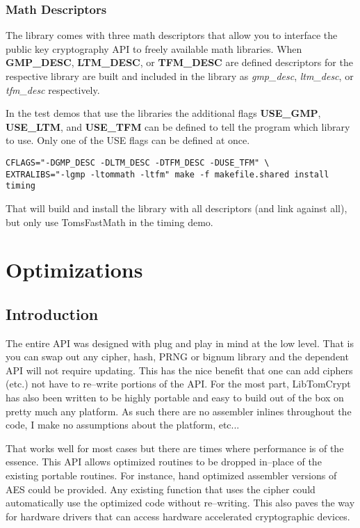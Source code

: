 \documentclass[synpaper]{book}
\newcommand{\mysection}[1]    %
	{                   %
	\section{#1}
   \markboth{\textsf{www.libtom.org}}{\thesection ~ {#1}}
	}
\begin{document}
\subsection{Math Descriptors}
The library comes with three math descriptors that allow you to interface the public key cryptography API to freely available math
libraries.  When \textbf{GMP\_DESC}, \textbf{LTM\_DESC}, or \textbf{TFM\_DESC} are defined
descriptors for the respective library are built and included in the library as \textit{gmp\_desc}, \textit{ltm\_desc}, or \textit{tfm\_desc} respectively.

In the test demos that use the libraries the additional flags \textbf{USE\_GMP}, \textbf{USE\_LTM}, and \textbf{USE\_TFM} can be defined
to tell the program which library to use.  Only one of the USE flags can be defined at once.

     
\begin{small}
\begin{verbatim}
CFLAGS="-DGMP_DESC -DLTM_DESC -DTFM_DESC -DUSE_TFM" \
EXTRALIBS="-lgmp -ltommath -ltfm" make -f makefile.shared install timing
\end{verbatim}
\end{small}

That will build and install the library with all descriptors (and link against all), but only use TomsFastMath in the timing demo.  

\chapter{Optimizations}
\mysection{Introduction}
The entire API was designed with plug and play in mind at the low level.  That is you can swap out any cipher, hash, PRNG or bignum library and the dependent API will not 
require updating.  This has the nice benefit that one can add ciphers (etc.) not have to re--write portions of the API.  For the most part, LibTomCrypt has also been written
to be highly portable and easy to build out of the box on pretty much any platform.  As such there are no assembler inlines throughout the code, I make no assumptions
about the platform, etc...

That works well for most cases but there are times where performance is of the essence.  This API allows optimized routines to be dropped in--place of the existing
portable routines.  For instance, hand optimized assembler versions of AES could be provided.  Any existing function that uses the cipher could automatically use
the optimized code without re--writing.  This also paves the way for hardware drivers that can access hardware accelerated cryptographic devices.
\end{document}
